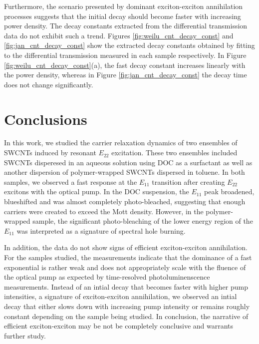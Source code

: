 Furthermore, the scenario presented by dominant exciton-exciton annihilation processes suggests that the initial decay should become faster with increasing power density. The decay constants extracted from the differential transmission data do not exhibit such a trend. Figures \ref{fig:weilu_cnt_decay_const} and \ref{fig:jan_cnt_decay_const} show the extracted decay constants obtained by fitting to the differential transmission measured in each sample respectively. In Figure \ref{fig:weilu_cnt_decay_const}(a), the fast decay constant increases linearly with the power density, whereas in Figure \ref{fig:jan_cnt_decay_const} the decay time does not change significantly.


\section{Conclusions}

In this work, we studied the carrier relaxation dynamics of two ensembles of SWCNTs induced by resonant $E_{22}$ excitation. These two ensembles included SWCNTs disperesed in an aqueous solution using DOC as a surfactant as well as another dispersion of polymer-wrapped SWCNTs dispersed in toluene. In both samples, we observed a fast response at the $E_{11}$ transition after creating $E_{22}$ excitons with the optical pump. In the DOC suspension, the $E_{11}$ peak broadened, blueshifted and was almost completely photo-bleached, suggesting that enough carriers were created to exceed the Mott density. However, in the polymer-wrapped sample, the significant photo-bleaching of the lower energy region of the $E_{11}$ was interpreted as a signature of spectral hole burning.

In addition, the data do not show signs of efficient exciton-exciton annihilation. For the samples studied, the measurements indicate that the dominance of a fast exponential is rather weak and does not appropriately scale with the fluence of the optical pump as expected by time-resolved photoluminenscence measurements. Instead of an intial decay that becomes faster with higher pump intensities, a signature of exciton-exciton annihilation, we observed an intial decay that either slows down with increasing pump intensity or remains roughly constant depending on the sample being studied. In conclusion, the narrative of efficient exciton-exciton may be not be completely conclusive and warrants further study. 
